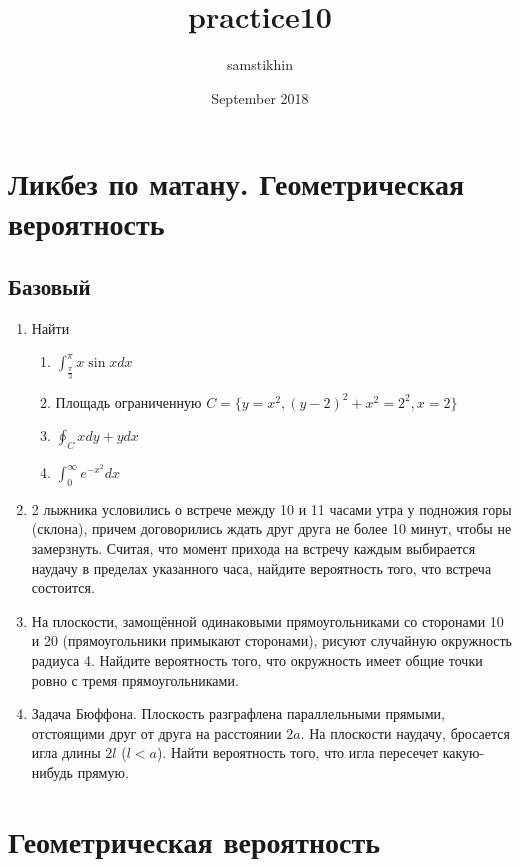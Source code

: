 \documentclass[a4paper, 14pt]{extarticle}
\title{practice10}
\author{samstikhin}
\date{September 2018}
\begin{document}
\section*{Ликбез по матану. Геометрическая вероятность}
\subsection*{Базовый}
\begin{enumerate}
\item Найти
\begin{enumerate}
    \item $\int_{\frac{\pi}{3}}^{\pi} x \sin{x} dx$
    \item Площадь ограниченную $C = \{y = x^2, (y-2)^2 + x^2 = 2^2,x = 2\}$
    \item $\oint_C xdy + ydx$
    \item $\int_{0}^{\infty}e^{-x^2}dx$
\end{enumerate}

\item 2 лыжника условились о встрече между
	10 и 11 часами утра у подножия горы (склона), причем договорились
	ждать друг друга не более 10 минут, чтобы не замерзнуть. Считая, что
	момент прихода на встречу каждым выбирается наудачу в пределах
	указанного часа, найдите вероятность того, что встреча состоится.
	\item На плоскости, замощённой одинаковыми прямоугольниками со сторонами 10 и 20 (прямоугольники примыкают сторонами), рисуют случайную окружность радиуса 4. Найдите вероятность того, что окружность имеет общие точки ровно с тремя прямоугольниками.
	\item Задача Бюффона. Плоскость разграфлена параллельными
	прямыми, отстоящими друг от друга на расстоянии $2a$. На плоскости
	наудачу, бросается игла длины $2l$ ($l<a$). Найти вероятность того, что
	игла пересечет какую-нибудь прямую.


\newpage

\end{enumerate}
\section*{Геометрическая вероятность}
\end{document}
